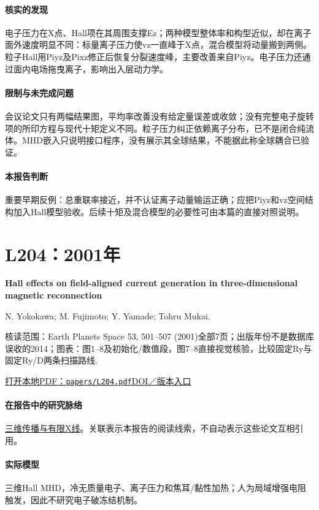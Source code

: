 \documentclass[UTF8,a4paper,11pt,openany,fontset=fandol]{ctexbook}
\begin{document}
\paragraph{核实的发现}电子压力在X点、Hall项在其周围支撑Ez；两种模型整体率和构型近似，却在离子面外速度明显不同：标量离子压力使vz一直峰于X点，混合模型将动量搬到两侧。粒子Hall用Piyz及Pixz修正后恢复分裂速度峰，主要改善来自Piyz。电子压力还通过面内电场拖曳离子，影响出入层动力学。

\paragraph{限制与未完成问题}会议论文只有两幅结果图，平均率改善没有给定量误差或收敛；没有完整电子旋转项的所印方程与现代十矩定义不同。粒子压力纠正依赖离子分布，已不是闭合纯流体。MHD嵌入只说明接口程序，没有展示其全球结果，不能据此称全球耦合已验证。

\paragraph{本报告判断}重要早期反例：总重联率接近，并不认证离子动量输运正确；应把Piyz和vz空间结构加入Hall模型验收。后续十矩及混合模型的必要性可由本篇的直接对照说明。

\section{L204：2001年}\label{paper:L204}

\textbf{Hall effects on field-aligned current generation in three-dimensional magnetic reconnection}\citep{L204}\

N. Yokokawa;  M. Fujimoto;  Y. Yamade;  Tohru Mukai.

\textsf{核读范围：}Earth Planets Space 53, 501–507 (2001)全部7页；出版年份不是数据库误收的2014；\textsf{图表：}图1–8及初始化/数值段，图7–8直接视觉核验，比较固定Ry与固定Ry/D两条扫描路线.

\href{run:../papers/L204.pdf}{打开本地PDF：\texttt{papers/L204.pdf}}\quad\href{https://doi.org/10.1186/bf03353262}{DOI／版本入口}

\paragraph{在报告中的研究脉络}\hyperref[story:three]{三维传播与有限X线}。关联表示本报告的阅读线索，不自动表示这些论文互相引用。

\paragraph{实际模型}三维Hall MHD，冷无质量电子、离子压力和焦耳/黏性加热；人为局域增强电阻触发，因此不研究电子破冻结机制。
\end{document}
